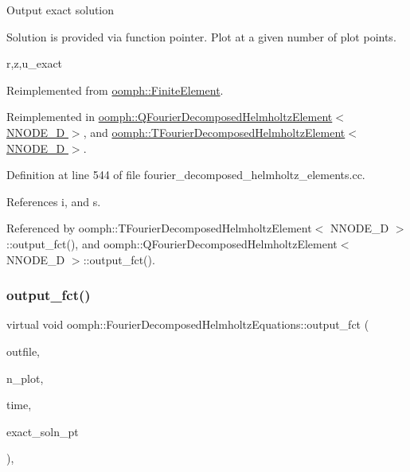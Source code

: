 Output exact solution

Solution is provided via function pointer. Plot at a given number of plot points.

r,z,u\+\_\+exact 

Reimplemented from \hyperlink{classoomph_1_1FiniteElement_a22b695c714f60ee6cd145be348042035}{oomph\+::\+Finite\+Element}.



Reimplemented in \hyperlink{classoomph_1_1QFourierDecomposedHelmholtzElement_a4ad5327722a3094908a1141e640a4c1e}{oomph\+::\+Q\+Fourier\+Decomposed\+Helmholtz\+Element$<$ N\+N\+O\+D\+E\+\_\+D $>$}, and \hyperlink{classoomph_1_1TFourierDecomposedHelmholtzElement_ac9683f67f96bc22aa36ac4009c97ffdd}{oomph\+::\+T\+Fourier\+Decomposed\+Helmholtz\+Element$<$ N\+N\+O\+D\+E\+\_\+D $>$}.



Definition at line 544 of file fourier\+\_\+decomposed\+\_\+helmholtz\+\_\+elements.\+cc.



References i, and s.



Referenced by oomph\+::\+T\+Fourier\+Decomposed\+Helmholtz\+Element$<$ N\+N\+O\+D\+E\+\_\+D $>$\+::output\+\_\+fct(), and oomph\+::\+Q\+Fourier\+Decomposed\+Helmholtz\+Element$<$ N\+N\+O\+D\+E\+\_\+D $>$\+::output\+\_\+fct().

\mbox{\label{classoomph_1_1FourierDecomposedHelmholtzEquations_a4a094945d74be0e025895f240d4b0072}} 
\subsubsection{\texorpdfstring{output\+\_\+fct()}{output\_fct()}\hspace{0.1cm}{\footnotesize\ttfamily [2/2]}}
{\footnotesize\ttfamily virtual void oomph\+::\+Fourier\+Decomposed\+Helmholtz\+Equations\+::output\+\_\+fct (\begin{DoxyParamCaption}\item[{std\+::ostream \&}]{outfile,  }\item[{const unsigned \&}]{n\+\_\+plot,  }\item[{const double \&}]{time,  }\item[{\hyperlink{classoomph_1_1FiniteElement_ad4ecf2b61b158a4b4d351a60d23c633e}{Finite\+Element\+::\+Unsteady\+Exact\+Solution\+Fct\+Pt}}]{exact\+\_\+soln\+\_\+pt }\end{DoxyParamCaption})\hspace{0.3cm}{\ttfamily [inline]}, {\ttfamily [virtual]}}




